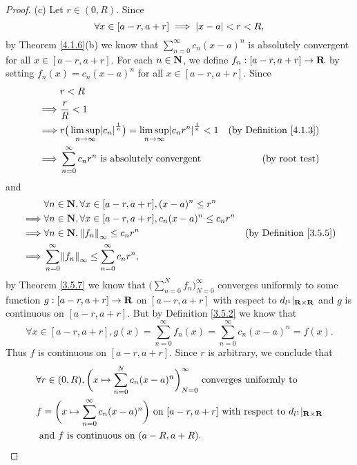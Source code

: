 \begin{proof}{(c)}
    Let \(r \in (0, R)\).
    Since
    \[
        \forall x \in [a - r, a + r] \implies \left\lvert x - a\right\rvert < r < R,
    \]
    by Theorem \ref{4.1.6}(b) we know that \(\sum_{n = 0}^\infty c_n (x - a)^n\) is absolutely convergent for all \(x \in [a - r, a + r]\).
    For each \(n \in \mathbf{N}\), we define \(f_n : [a - r, a + r] \to \mathbf{R}\) by setting \(f_n(x) = c_n (x - a)^n\) for all \(x \in [a - r, a + r]\).
    Since
    \begin{align*}
                 & r < R                                                                                                                                                    \\
        \implies & \frac{r}{R} < 1                                                                                                                                          \\
        \implies & r \big(\limsup_{n \to \infty} \abs{c_n}^{\frac{1}{n}}\big) = \limsup_{n \to \infty} \abs{c_n r^n}^{\frac{1}{n}} < 1 & \text{(by Definition \ref{4.1.3})} \\
        \implies & \sum_{n = 0}^\infty c_n r^n \text{ is absolutely convergent}                                                        & \text{(by root test)}
    \end{align*}
    and
    \begin{align*}
                 & \forall n \in \N, \forall x \in [a - r, a + r], (x - a)^n \leq r^n                                              \\
        \implies & \forall n \in \N, \forall x \in [a - r, a + r], c_n (x - a)^n \leq c_n r^n                                      \\
        \implies & \forall n \in \N, \norm*{f_n}_\infty \leq c_n r^n                          & \text{(by Definition \ref{3.5.5})} \\
        \implies & \sum_{n = 0}^\infty \norm*{f_n}_\infty \leq \sum_{n = 0}^\infty c_n r^n,
    \end{align*}
    by Theorem \ref{3.5.7} we know that \(\big(\sum_{n = 0}^N f_n\big)_{N = 0}^\infty\) converges uniformly to some function \(g : [a - r, a + r] \to \mathbf{R}\) on \([a - r, a + r]\) with respect to \(d_{l^1}|_{\mathbf{R} \times \mathbf{R}}\) and \(g\) is continuous on \([a - r, a + r]\).
    But by Definition \ref{3.5.2} we know that
    \[
        \forall x \in [a - r, a + r], g(x) = \sum_{n = 0}^\infty f_n(x) = \sum_{n = 0}^\infty c_n (x - a)^n = f(x).
    \]
    Thus \(f\) is continuous on \([a - r, a + r]\).
    Since \(r\) is arbitrary, we conclude that
    \begin{align*}
         & \forall r \in (0, R), \bigg(x \mapsto \sum_{n = 0}^N c_n (x - a)^n\bigg)_{N = 0}^\infty \text{ converges uniformly to }                 \\
         & f = \bigg(x \mapsto \sum_{n = 0}^\infty c_n (x - a)^n\bigg) \text{ on } [a - r, a + r] \text{ with respect to } d_{l^1}|_{\mathbf{R} \times \mathbf{R}} \\
         & \text{ and } f \text{ is continuous on } (a - R, a + R).
    \end{align*}
\end{proof}

